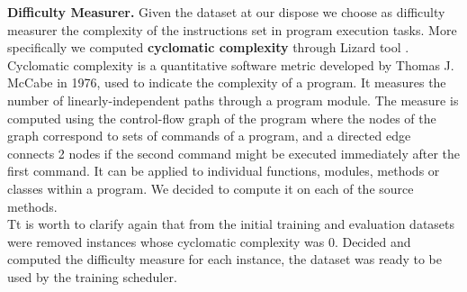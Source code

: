 

\noindent\textbf{Difficulty Measurer.} Given the dataset at our dispose we choose as difficulty measurer the 
complexity of the instructions set in program execution tasks. More specifically we 
computed \textbf{cyclomatic complexity} through Lizard tool \cite{lizard}. Cyclomatic complexity
is a quantitative software metric developed by Thomas J. McCabe in 1976, used to indicate
the complexity of a program.  
It measures the number of linearly-independent paths through a program module. 
The measure is computed using the control-flow graph of the program where
the nodes of the graph correspond to sets of commands of a program, and
a directed edge connects 2 nodes if the second command might be executed
immediately after the first command. It can be applied to individual functions,
modules, methods or classes within a program. We decided to compute it on each of
the source methods.\\
Tt is worth to clarify again that from the initial training and evaluation datasets were removed instances whose
cyclomatic complexity was 0. Decided and computed the difficulty measure
for each instance, the dataset was ready to be used by the training scheduler.\newline

